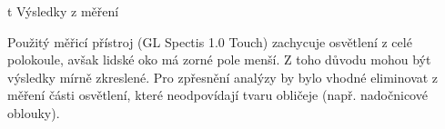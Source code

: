
\medskip
\midinsert {}
\caption/t Výsledky z měření
\endinsert

\medskip
\medskip
\medskip
Použitý měřicí přístroj (GL Spectis 1.0 Touch) zachycuje osvětlení z celé polokoule,
avšak lidské oko má zorné pole menší. Z toho důvodu mohou být výsledky mírně zkreslené.
Pro zpřesnění analýzy by bylo vhodné eliminovat z měření části osvětlení, které neodpovídají tvaru obličeje
(např. nadočnicové oblouky).







